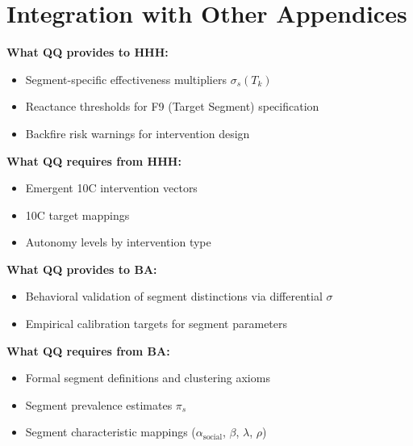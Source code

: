 \section{Integration with Other Appendices}
\label{sec:qq-integration}

\begin{tcolorbox}[colback=yellow!5!white, colframe=yellow!75!black,
    title=Integration: QQ $\leftrightarrow$ HHH (METHOD-TOOLKIT)]
\textbf{What QQ provides to HHH:}
\begin{itemize}[nosep]
\item Segment-specific effectiveness multipliers $\sigma_s(T_k)$
\item Reactance thresholds for F9 (Target Segment) specification
\item Backfire risk warnings for intervention design
\end{itemize}

\textbf{What QQ requires from HHH:}
\begin{itemize}[nosep]
\item Emergent 10C intervention vectors
\item 10C target mappings
\item Autonomy levels by intervention type
\end{itemize}
\end{tcolorbox}

\begin{tcolorbox}[colback=yellow!5!white, colframe=yellow!75!black,
    title=Integration: QQ $\leftrightarrow$ BA (FORMAL-SEGMENT)]
\textbf{What QQ provides to BA:}
\begin{itemize}[nosep]
\item Behavioral validation of segment distinctions via differential $\sigma$
\item Empirical calibration targets for segment parameters
\end{itemize}

\textbf{What QQ requires from BA:}
\begin{itemize}[nosep]
\item Formal segment definitions and clustering axioms
\item Segment prevalence estimates $\pi_s$
\item Segment characteristic mappings ($\alpha_{\text{social}}$, $\beta$, $\lambda$, $\rho$)
\end{itemize}
\end{tcolorbox}


